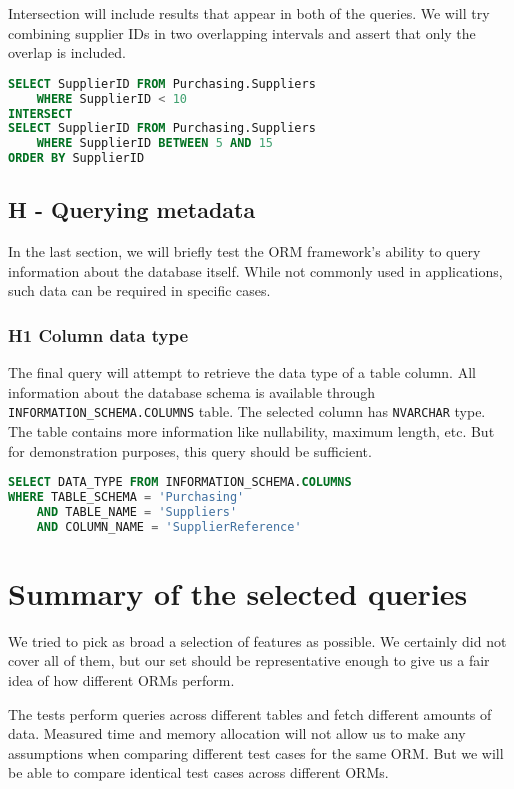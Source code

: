 Intersection will include results that appear in both of the queries. We will try combining supplier IDs in two overlapping intervals and assert that only the overlap is included. 

\begin{lstlisting}[language=SQL]
SELECT SupplierID FROM Purchasing.Suppliers 
    WHERE SupplierID < 10
INTERSECT
SELECT SupplierID FROM Purchasing.Suppliers 
    WHERE SupplierID BETWEEN 5 AND 15
ORDER BY SupplierID
\end{lstlisting}

\subsection{H - Querying metadata}
In the last section, we will briefly test the ORM framework's ability to query information about the database itself. While not commonly used in applications, such data can be required in specific cases.

\subsubsection*{H1 Column data type} \label{query:h1}
The final query will attempt to retrieve the data type of a table column. All information about the database schema is available through \texttt{INFORMATION\_SCHEMA.COLUMNS} table. The selected column has \texttt{NVARCHAR} type. The table contains more information like nullability, maximum length, etc. But for demonstration purposes, this query should be sufficient.

\begin{lstlisting}[language=SQL]
SELECT DATA_TYPE FROM INFORMATION_SCHEMA.COLUMNS 
WHERE TABLE_SCHEMA = 'Purchasing'
    AND TABLE_NAME = 'Suppliers'
    AND COLUMN_NAME = 'SupplierReference'
\end{lstlisting}

\section{Summary of the selected queries}
We tried to pick as broad a selection of features as possible. 
We certainly did not cover all of them, but our set should be representative enough to give us a fair idea of how different ORMs perform. 

The tests perform queries across different tables and fetch different amounts of data. 
Measured time and memory allocation will not allow us to make any assumptions when comparing different test cases for the same ORM.
But we will be able to compare identical test cases across different ORMs.

